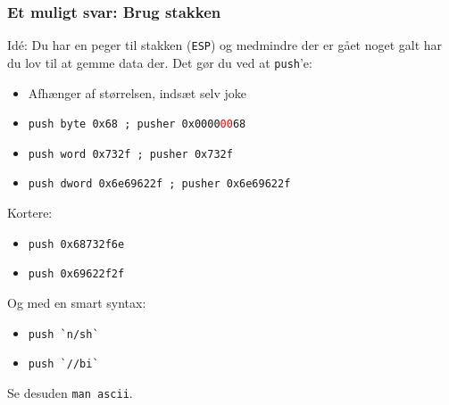 \documentclass[slidestop,compress,mathserif, xcolor=table]{beamer}
\begin{document}
\begin{frame}[c]
    \frametitle{Et muligt svar: Brug stakken}

    \pause Idé: Du har en peger til stakken (\texttt{ESP}) og medmindre der er
    gået noget galt har du lov til at gemme data der. Det gør du ved at
    \texttt{push}'e:\vskip8pt

    \begin{itemize}
        \pause\item Afhænger af størrelsen, indsæt selv joke

        \pause\item \texttt{push byte 0x68         ; pusher
          0x0000\textcolor{red}{00}68}

        \pause\item \texttt{push word 0x732f       ; pusher 0x732f}

        \pause\item \texttt{push dword 0x6e69622f  ; pusher 0x6e69622f}
    \end{itemize} \vskip8pt

    \pause Kortere:
    \begin{itemize}
        \item \texttt{push 0x68732f6e}
        \item \texttt{push 0x69622f2f}
    \end{itemize} \vskip8pt

    \pause Og med en smart syntax:
    \begin{itemize}
        \item \texttt{push \`{}n/sh\`{}}
        \item \texttt{push \`{}//bi\`{}}
    \end{itemize}

    Se desuden \texttt{man ascii}.
\end{frame}
\end{document}
